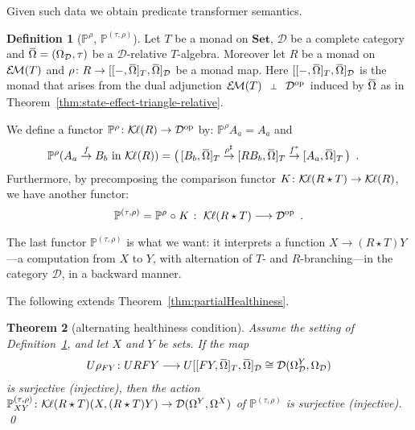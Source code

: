 \documentclass[9pt, preprint]{sigplanconf}
\theoremstyle{theorem}
\newtheorem{theorem}{Theorem}[section]
\theoremstyle{definition}
\newtheorem{definition}[theorem]{Definition}
\newcommand{\cat}[1]{\mathcal{#1}}
\renewcommand{\bar}{\overbar}
\newcommand{\overbar}[1]{\mkern 1.5mu\overline{\mkern-1.5mu#1\mkern-1.5mu}\mkern 1.5mu}
\newcommand{\place}{{-}}
\newcommand{\op}{\mathrm{op}}
\newcommand{\Set}{\mathbf{Set}}
\newcommand{\EM}{\mathcal{E}{\kern-.5ex}\mathcal{M}}
\newcommand{\Kl}{\mathcal{K}{\kern-.2ex}\ell}
\newcommand{\OmegaD}{\Omega_{\cat{D}}}
\newcommand{\co}{\mathrel{\circ}}
\newcommand{\bbP}{\mathbb{P}}
\newcommand{\longto}{\longrightarrow}
\begin{document}
Given such data we obtain predicate transformer semantics.


\begin{definition}[$\bbP^{\rho}$, $\bbP^{(\tau, \rho)}$]
  \label{def:alternating-pred-transf}
  Let $T$ be a monad on $\Set$, $\cat{D}$ be a complete category
  and $\bar{\Omega} = (\OmegaD, \tau)$ be a $\cat{D}$-relative $T$-algebra.
  Moreover let $R$ be a monad on $\EM(T)$
  and $\rho \colon R \to [[\place , \bar{\Omega}]_{T} , \bar{\Omega}]_{\cat{D}}$ be a monad map.
  Here $[[\place , \bar{\Omega}]_{T} , \bar{\Omega}]_{\cat{D}}$ is the monad
  that arises from the dual adjunction
  \begin{math}
    \xymatrix@1@C-.5em{
      {\EM(T)}
        \ar@/^.4em/[r]
        \ar@{}[r]|-{\bot}
      &
      {\cat{D}^{\op}}
        \ar@/^.4em/[l]
    }
  \end{math}
  induced by $\bar{\Omega}$ as in Theorem~\ref{thm:state-effect-triangle-relative}.

 We define a functor $\bbP^{\rho} \colon \Kl(R) \to \cat{D}^{\op}$
 by:
  $\bbP^{\rho} A_a = A_a$ and
  \begin{align*}
\bbP^{\rho}(A_a \stackrel{f}{\to} B_b
 \text{ in $\Kl(R)$}
)
      &= \bigl(\,[B_b, \bar{\Omega}]_{T} \stackrel{\rho^{\sharp}}{\to}
          [R B_b, \bar{\Omega}]_{T} \stackrel{f^*}{\to}
            [A_a, \bar{\Omega}]_{T} \,\bigr)\enspace .
  \end{align*}
 Furthermore,
by  precomposing
the comparison functor $K \colon \Kl(R \star T) \to \Kl(R)$,
  we have another functor:
  \begin{equation}
    \bbP^{(\tau, \rho)} = \bbP^{\rho} \co K \;\colon\; \Kl(R \star T) \longto \cat{D}^{\op}
    \enspace .
  \end{equation}
\end{definition}
\noindent
The last functor $\bbP^{(\tau, \rho)}$ is what we want: it interprets
a function $X\to (R\star T)Y$---a computation from $X$ to $Y$, with
alternation of $T$- and $R$-branching---in the category
$\cat{D}$, in a backward manner.

 The following extends Theorem~\ref{thm:partialHealthiness}.

\begin{theorem}[alternating healthiness condition]
  \label{thm:alternating-healthiness}
 Assume the setting of Definition~\ref{def:alternating-pred-transf}, and
 let $X$ and $Y$ be sets. If the map
  \begin{align*}
    U \rho_{FY} \colon U R F Y
        \longto U [[FY, \bar{\Omega}]_{T}, \bar{\Omega}]_{\cat{D}}
        \cong \cat{D}(\OmegaD^Y, \OmegaD)
  \end{align*}
  is surjective (injective), then the action
  $\bbP^{(\tau, \rho)}_{XY} \colon \Kl(R \star T)(X, (R \star T) Y) \to
    \cat{D}(\Omega^Y, \Omega^X)$ of $\bbP^{(\tau, \rho)}$ is surjective
 (injective). \qed
\end{theorem}
\end{document}
